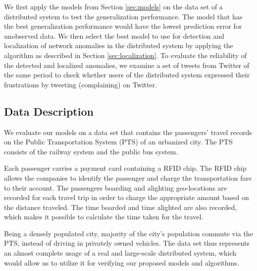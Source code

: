 \documentclass[conference]{IEEEtran.1.8}
\begin{document}
We first apply the models from Section \ref{sec:models} on the data set of a distributed system to test the generalization performance. The model that has the best generalization performance would have the lowest prediction error for unobserved data. We then select the best model to use for detection and localization of network anomalies in the distributed system by applying the algorithm as described in Section \ref{sec:localization}. To evaluate the reliability of the detected and localized anomalies, we examine a set of tweets from Twitter of the same period to check whether users of the distributed system expressed their frustrations by tweeting (complaining) on Twitter.

\subsection{Data Description}

We evaluate our models on a data set that contains the passengers' travel records on the Public Transportation System (PTS) of an urbanized city. The PTS consists of the railway system and the public bus system.

Each passenger carries a payment card containing a RFID chip. The RFID chip allows the companies to identify the passenger and charge the transportation fare to their account. The passengers boarding and alighting geo-locations are recorded for each travel trip in order to charge the appropriate amount based on the distance traveled. The time boarded and time alighted are also recorded, which makes it possible to calculate the time taken for the travel.

Being a densely populated city, majority of the city's population commute via the PTS, instead of driving in privately owned vehicles. The data set thus represents an almost complete usage of a real and large-scale distributed system, which would allow us to utilize it for verifying our proposed models and algorithms.
\end{document}
